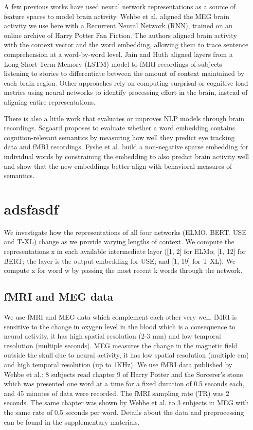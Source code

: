 \documentclass{article}
\begin{document}
A few previous works have used neural network representations as a source of feature spaces to model brain activity. Wehbe et al.\cite{wehbe2014simultaneously} aligned the MEG brain activity we use here with a Recurrent Neural Network (RNN), trained on an online archive of Harry Potter Fan Fiction. The authors aligned brain activity with the context vector and the word embedding, allowing them to trace sentence comprehension at a word-by-word level. Jain and Huth\cite{jain2018incorporating} aligned layers from a Long Short-Term Memory (LSTM) model to fMRI recordings of subjects listening to stories to differentiate between the amount of context maintained by each brain region. Other approaches rely on computing surprisal or cognitive load metrics using neural networks to identify processing effort in the brain, instead of aligning entire representations\cite{frank2015erp}.

There is also a little work that evaluates or improves NLP models through brain recordings. Søgaard\cite{sogaard2016evaluating} proposes to evaluate whether a word embedding contains cognition-relevant semantics by measuring how well they predict eye tracking data and fMRI recordings. Fyshe et al.\cite{fyshe2014interpretable} build a non-negative sparse embedding for individual words by constraining the embedding to also predict brain activity well and show that the new embeddings better align with behavioral measures of semantics.


\section{adsfasdf}\label{sec:sdafdsda}

We investigate how the representations of all four networks (ELMO, BERT, USE and T-XL) change as we provide varying lengths of context. We compute the representations x in each available intermediate layer ([1, 2] for ELMo; [1, 12] for BERT; the layer is the output embedding for USE; and [1, 19] for T-XL). We compute x for word w by passing the most recent k words through the network.

\subsection{fMRI and MEG data} 
We use fMRI and MEG data which complement each other very well. fMRI is sensitive to the change in oxygen level in the blood which is a consequence to neural activity, it has high spatial resolution (2-3 mm) and low temporal resolution (multiple seconds). MEG measures the change in the magnetic field outside the skull due to neural activity, it has low spatial resolution (multiple cm) and high temporal resolution (up to 1KHz). We use fMRI data published by Wehbe et al.\cite{wehbe2014simultaneously}: 8 subjects read chapter 9 of Harry Potter and the Sorcerer’s stone\cite{rowling2012harry} which was presented one word at a time for a fixed duration of 0.5 seconds each, and 45 minutes of data were recorded. The fMRI sampling rate (TR) was 2 seconds. The same chapter was shown by Wehbe et al.\cite{wehbe2014aligning} to 3 subjects in MEG with the same rate of 0.5 seconds per word. Details about the data and preprocessing can be found in the supplementary materials.
\end{document}
